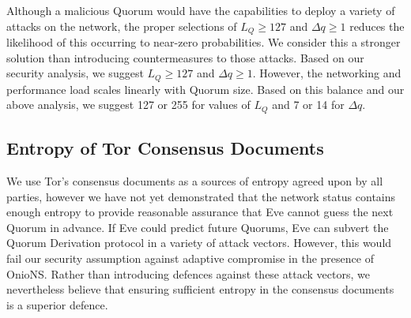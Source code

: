 \documentclass{sig-alternate}
\begin{document}
Although a malicious Quorum would have the capabilities to deploy a variety of attacks on the network, the proper selections of $ L_{Q} \geq 127 $ and $ \Delta q \geq 1 $ reduces the likelihood of this occurring to near-zero probabilities. We consider this a stronger solution than introducing countermeasures to those attacks. Based on our security analysis, we suggest $ L_{Q} \geq 127 $ and $ \Delta q \geq 1 $. However, the networking and performance load scales linearly with Quorum size. Based on this balance and our above analysis, we suggest 127 or 255 for values of $ L_{Q} $ and 7 or 14 for $ \Delta q $.

\newpage

\subsection{Entropy of Tor Consensus Documents}

We use Tor's consensus documents as a sources of entropy agreed upon by all parties, however we have not yet demonstrated that the network status contains enough entropy to provide reasonable assurance that Eve cannot guess the next Quorum in advance. If Eve could predict future Quorums, Eve can subvert the Quorum Derivation protocol in a variety of attack vectors. However, this would fail our security assumption against adaptive compromise in the presence of OnioNS. Rather than introducing defences against these attack vectors, we nevertheless believe that ensuring sufficient entropy in the consensus documents is a superior defence.

%	
\end{document}
